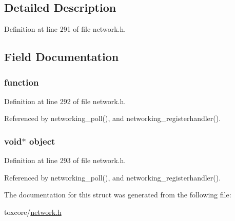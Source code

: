 \subsection{Detailed Description}


Definition at line 291 of file network.\+h.



\subsection{Field Documentation}
\hypertarget{struct_packet___handles_a197979c60c06b39ac717b08f5091dd0e}{
\subsubsection[{function}]{ function}}\label{struct_packet___handles_a197979c60c06b39ac717b08f5091dd0e}


Definition at line 292 of file network.\+h.



Referenced by networking\+\_\+poll(), and networking\+\_\+registerhandler().

\hypertarget{struct_packet___handles_a077376d12464f945e2414d5499c79b3f}{
\subsubsection[{object}]{\setlength{\rightskip}{0pt plus 5cm}void$\ast$ object}}\label{struct_packet___handles_a077376d12464f945e2414d5499c79b3f}


Definition at line 293 of file network.\+h.



Referenced by networking\+\_\+poll(), and networking\+\_\+registerhandler().



The documentation for this struct was generated from the following file\+:\begin{DoxyCompactItemize}
\item 
toxcore/\hyperlink{network_8h}{network.\+h}\end{DoxyCompactItemize}
